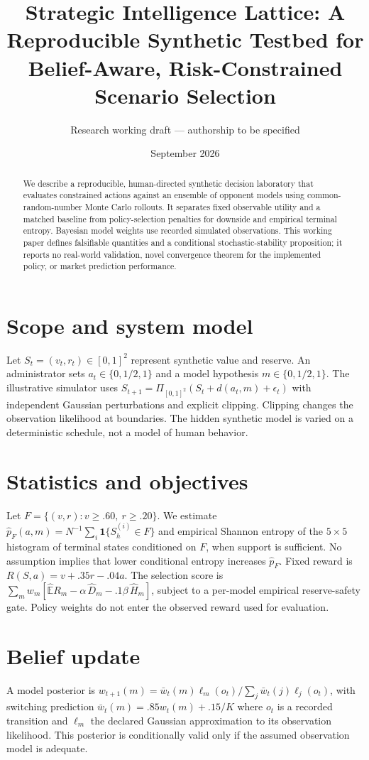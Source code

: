 \documentclass[11pt]{article}
\title{Strategic Intelligence Lattice: A Reproducible Synthetic Testbed for Belief-Aware, Risk-Constrained Scenario Selection}
\author{Research working draft --- authorship to be specified}
\date{September 2026}
\begin{document}
\maketitle
\begin{abstract}
We describe a reproducible, human-directed synthetic decision laboratory that evaluates constrained actions against an ensemble of opponent models using common-random-number Monte Carlo rollouts. It separates fixed observable utility and a matched baseline from policy-selection penalties for downside and empirical terminal entropy. Bayesian model weights use recorded simulated observations. This working paper defines falsifiable quantities and a conditional stochastic-stability proposition; it reports no real-world validation, novel convergence theorem for the implemented policy, or market prediction performance.
\end{abstract}
\section{Scope and system model}
Let $S_t=(v_t,r_t)\in[0,1]^2$ represent synthetic value and reserve. An administrator sets $a_t\in\{0,1/2,1\}$ and a model hypothesis $m\in\{0,1/2,1\}$. The illustrative simulator uses $S_{t+1}=\Pi_{[0,1]^2}(S_t+d(a_t,m)+\epsilon_t)$ with independent Gaussian perturbations and explicit clipping. Clipping changes the observation likelihood at boundaries. The hidden synthetic model is varied on a deterministic schedule, not a model of human behavior.
\section{Statistics and objectives}
Let $F=\{(v,r):v\ge .60,\ r\ge .20\}$. We estimate $\hat p_F(a,m)=N^{-1}\sum_i\mathbf1\{S_h^{(i)}\in F\}$ and empirical Shannon entropy of the $5\times5$ histogram of terminal states conditioned on $F$, when support is sufficient. No assumption implies that lower conditional entropy increases $\hat p_F$. Fixed reward is $R(S,a)=v+.35r-.04a$. The selection score is $\sum_m w_m[\widehat{\mathbb E}R_m-\alpha\,\widehat{D}_m-.1\beta\,\hat H_m]$, subject to a per-model empirical reserve-safety gate. Policy weights do not enter the observed reward used for evaluation.
\section{Belief update}
A model posterior is $w_{t+1}(m)=\bar w_t(m)\ell_m(o_t)/\sum_j\bar w_t(j)\ell_j(o_t)$, with switching prediction $\bar w_t(m)=.85w_t(m)+.15/K$ where $o_t$ is a recorded transition and $\ell_m$ the declared Gaussian approximation to its observation likelihood. This posterior is conditionally valid only if the assumed observation model is adequate.
\end{document}
